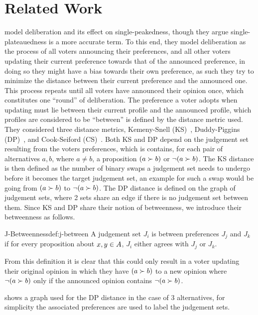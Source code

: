 \section{Related Work} \label{section:related_work}
\citet{radDeliberationSinglePeakednessCoherent2021} model deliberation and its
effect on single-peakedness, though they argue single-plateauedness is a more
accurate term. To this end, they model deliberation as the process of all
voters announcing their preferences, and all other voters updating their
current preference towards that of the announced preference, in doing so they
might have a bias towards their own preference, as such they try to minimize
the distance between their current preference and the announced one. This
process repeats until all voters have announced their opinion once, which
constitutes one ``round'' of deliberation. The preference a voter adopts when
updating must lie between their current profile and the announced profile,
which profiles are considered to be ``between'' is defined by the distance
metric used. They considered three distance metrics, Kemeny-Snell
(KS)~\citep{kemeny1962preference}, Duddy-Piggins
(DP)~\citep{duddyMeasureDistanceJudgment2012}, and Cook-Seiford
(CS)~\citep{cookPriorityRankingConsensus1978}. Both KS and DP depend on the
judgement set resulting from the voters preferences, which is contains, for
each pair of alternatives $a,b$, where $a \neq b$, a proposition $(a \succ b)$ or $\neg (a
\succ b)$. The KS distance is then defined as the number of binary swaps a
judgement set needs to undergo before it becomes the target judgement set, an
example for such a swap would be going from $(a \succ b)$ to $\neg (a \succ
b)$. The DP distance is defined on the graph of judgement sets, where 2 sets
share an edge if there is no judgement set between them. Since KS and DP share
their notion of betweenness, we introduce their betweenness as follows.

\begin{definition}{J-Betweenness}{def:j-between} A judgement set $J_i$ is
between preferences $J_j$ and $J_k$ if for every proposition about $x,y \in
A$, $J_i$ either agrees with $J_j$ or $J_k$. \end{definition}

From this definition it is clear that this could only result in a voter
updating their original opinion in which they have $(a \succ b)$ to a new
opinion where $\neg (a\succ b)$ only if the announced opinion contains $\neg (a
\succ b)$.

 shows a graph used for the DP distance in the case of
3 alternatives, for simplicity the associated preferences are used to label the
judgement sets.


